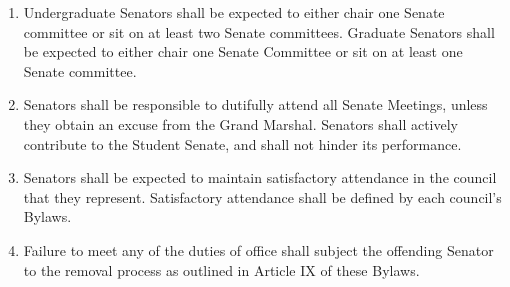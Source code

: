 
\begin{enumerate}

\item Undergraduate Senators shall be expected to either chair one Senate committee or sit on at least two Senate committees.
Graduate Senators shall be expected to either chair one Senate Committee or sit on at least one Senate committee.

\item Senators shall be responsible to dutifully attend all Senate Meetings, unless they obtain an excuse from the Grand Marshal.
Senators shall actively contribute to the Student Senate, and shall not hinder its performance.

\item Senators shall be expected to maintain satisfactory attendance in the council that they represent. Satisfactory attendance shall
be defined by each council’s Bylaws.

\item Failure to meet any of the duties of office shall subject the offending Senator to the removal process as outlined in Article IX of
these Bylaws.

\end{enumerate}

